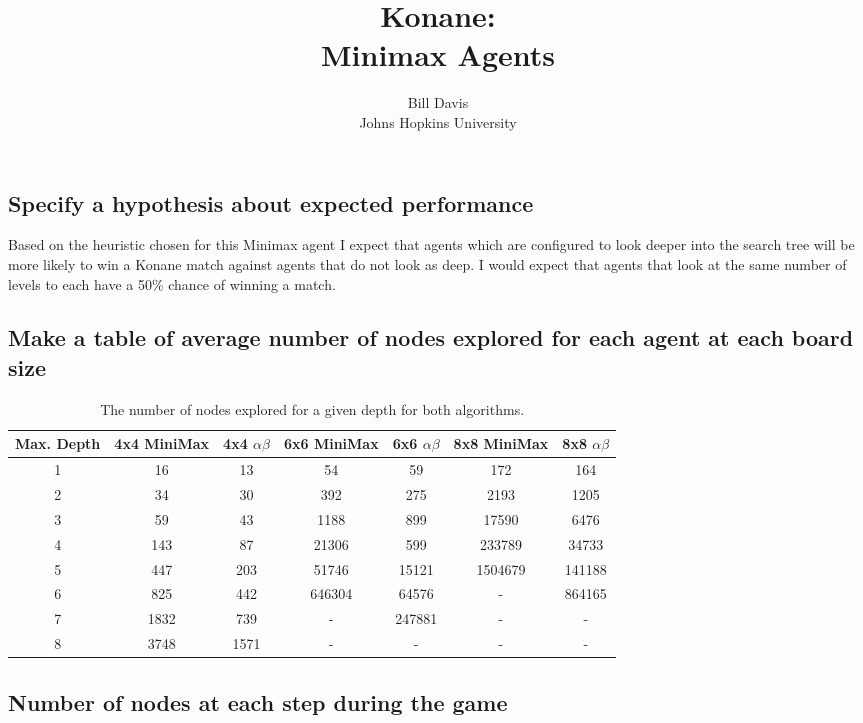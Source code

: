 \documentclass[12pt,letterpaper]{article}
\title{Konane: \\ Minimax Agents}
\author{Bill Davis \\ Johns Hopkins University}
\begin{document}
\maketitle

\subsection{Specify a hypothesis about expected performance} 
Based on the heuristic chosen for this Minimax agent I expect that agents which are configured to look deeper into the search tree will be more likely to win a Konane match against agents that do not look as deep. I would expect that agents that look at the same number of levels to each have a 50\% chance of winning a match. 

\subsection{Make a table of average number of nodes explored for each agent at each board size}

\begin{table}[h]
\begin{tabular}{ |c|c|c|c|c|c|c| }
\hline
Max. Depth  &   4x4 MiniMax & 4x4 $\alpha \beta$ &   6x6 MiniMax & 6x6 $\alpha \beta$ &   8x8 MiniMax & 8x8 $\alpha \beta$\\
\hline
1 & 16 & 13 & 54 & 59 & 172 & 164 \\
2 & 34 & 30 & 392 & 275 & 2193 & 1205 \\
3 & 59 & 43 & 1188 & 899 & 17590 & 6476 \\
4 & 143 & 87 & 21306 &599 & 233789 & 34733 \\
5 & 447 & 203 & 51746 & 15121 & 1504679 & 141188 \\
6 & 825 & 442 & 646304 & 64576 & - & 864165 \\
7 & 1832 & 739 & - & 247881 & - & - \\
8 & 3748 & 1571 & - & -  & - & - \\
\hline
\end{tabular}
\caption{The number of nodes explored for a given depth for both algorithms. }

\end{table}

\subsection{Number of nodes at each step during the game} 
\end{document}
